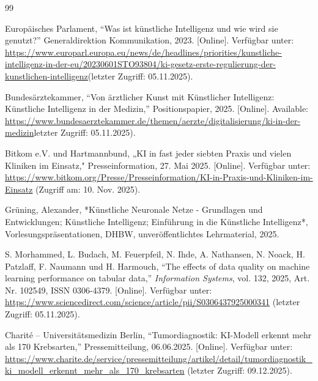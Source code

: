 \documentclass[lettersize,journal]{IEEEtran}
\begin{document}
	\begin{thebibliography}{99}
		
		


Europäisches Parlament, ``Was ist künstliche Intelligenz und wie wird sie genutzt?'' Generaldirektion Kommunikation, 2023. [Online]. Verfügbar unter: \url{https://www.europarl.europa.eu/news/de/headlines/priorities/kunstliche-intelligenz-in-der-eu/20230601STO93804/ki-gesetz-erste-regulierung-der-kunstlichen-intelligenz}(letzter Zugriff: 05.11.2025).
		
Bundesärztekammer, ``Von ärztlicher Kunst mit Künstlicher Intelligenz: Künstliche Intelligenz in der Medizin,'' Positionspapier, 2025. [Online]. Available: \url{https://www.bundesaerztekammer.de/themen/aerzte/digitalisierung/ki-in-der-medizin}letzter Zugriff: 05.11.2025).

Bitkom e.V. und Hartmannbund, 
„KI in fast jeder siebten Praxis und vielen Kliniken im Einsatz," 
Presseinformation, 27. Mai 2025. [Online].  
Verfügbar unter: \url{https://www.bitkom.org/Presse/Presseinformation/KI-in-Praxis-und-Kliniken-im-Einsatz}  
(Zugriff am: 10. Nov. 2025).

Grüning, Alexander, *Künstliche Neuronale Netze - Grundlagen und Entwicklungen; 
Künstliche Intelligenz; Einführung in die Künstliche Intelligenz*, 
Vorlesungspräsentationen, DHBW, unveröffentlichtes Lehrmaterial, 2025.


S. Morhammed, L. Budach, M. Feuerpfeil, N. Ihde, A. Nathansen, N. Noack, H. Patzlaff, F. Naumann und H. Harmouch, 
``The effects of data quality on machine learning performance on tabular data,'' 
\textit{Information Systems}, vol. 132, 2025, Art. Nr. 102549, ISSN 0306-4379. 
[Online]. Verfügbar unter: \url{https://www.sciencedirect.com/science/article/pii/S0306437925000341} 
(letzter Zugriff: 05.11.2025).  




Charité – Universitätsmedizin Berlin, ``Tumordiagnostik: KI-Modell erkennt mehr als 170 Krebsarten,'' Pressemitteilung, 06.06.2025. [Online]. Verfügbar unter: 
\url{https://www.charite.de/service/pressemitteilung/artikel/detail/tumordiagnostik_ki_modell_erkennt_mehr_als_170_krebsarten} 
(letzter Zugriff: 09.12.2025).


\end{thebibliography}
\end{document}
